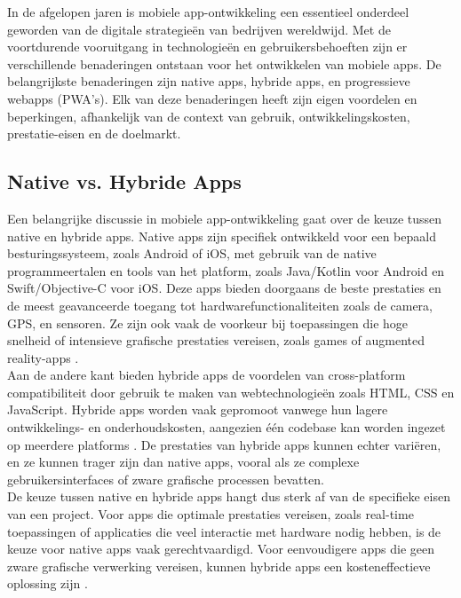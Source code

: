 \noindent In de afgelopen jaren is mobiele app-ontwikkeling een essentieel onderdeel geworden van de digitale strategieën van bedrijven wereldwijd. Met de voortdurende vooruitgang in technologieën en gebruikersbehoeften zijn er verschillende benaderingen ontstaan voor het ontwikkelen van mobiele apps. De belangrijkste benaderingen zijn native apps, hybride apps, en progressieve webapps (PWA's). Elk van deze benaderingen heeft zijn eigen voordelen en beperkingen, afhankelijk van de context van gebruik, ontwikkelingskosten, prestatie-eisen en de doelmarkt.

\subsection{Native vs. Hybride Apps} 
\noindent Een belangrijke discussie in mobiele app-ontwikkeling gaat over de keuze tussen native en hybride apps. Native apps zijn specifiek ontwikkeld voor een bepaald besturingssysteem, zoals Android of iOS, met gebruik van de native programmeertalen en tools van het platform, zoals Java/Kotlin voor Android en Swift/Objective-C voor iOS. Deze apps bieden doorgaans de beste prestaties en de meest geavanceerde toegang tot hardwarefunctionaliteiten zoals de camera, GPS, en sensoren. Ze zijn ook vaak de voorkeur bij toepassingen die hoge snelheid of intensieve grafische prestaties vereisen, zoals games of augmented reality-apps \autocite{Lau2022}.\\

\noindent Aan de andere kant bieden hybride apps de voordelen van cross-platform compatibiliteit door gebruik te maken van webtechnologieën zoals HTML, CSS en JavaScript. Hybride apps worden vaak gepromoot vanwege hun lagere ontwikkelings- en onderhoudskosten, aangezien één codebase kan worden ingezet op meerdere platforms \autocite{Singh2024}. De prestaties van hybride apps kunnen echter variëren, en ze kunnen trager zijn dan native apps, vooral als ze complexe gebruikersinterfaces of zware grafische processen bevatten.\\

\noindent De keuze tussen native en hybride apps hangt dus sterk af van de specifieke eisen van een project. Voor apps die optimale prestaties vereisen, zoals real-time toepassingen of applicaties die veel interactie met hardware nodig hebben, is de keuze voor native apps vaak gerechtvaardigd. Voor eenvoudigere apps die geen zware grafische verwerking vereisen, kunnen hybride apps een kosteneffectieve oplossing zijn \autocite{Microsoft}.

